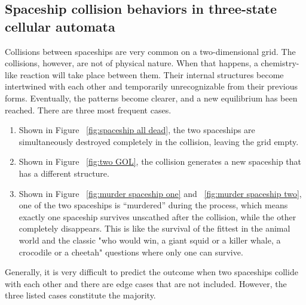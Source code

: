 \documentclass[12pt]{article}
\numberwithin{figure}{section} %
\begin{document}
\subsection{Spaceship collision behaviors in three-state cellular automata}
Collisions between spaceships are very common on a two-dimensional grid. The collisions, however, are not of physical nature. When that happens, a chemistry-like reaction will take place between them. Their internal structures become intertwined with each other and temporarily unrecognizable from their previous forms. Eventually, the patterns become clearer, and a new equilibrium has been reached. There are three most frequent cases. 
\begin{enumerate}[topsep=0pt,itemsep=-1ex,partopsep=1ex,parsep=1ex]
\item Shown in Figure ~\ref{fig:spaceship all dead}, the two spaceships are simultaneously destroyed completely in the collision, leaving the grid empty. 
\item Shown in Figure ~\ref{fig:two GOL}, the collision generates a new spaceship that has a different structure. 
\item Shown in Figure ~\ref{fig:murder spaceship one} and ~\ref{fig:murder spaceship two}, one of the two spaceships is “murdered” during the process, which means exactly one spaceship survives unscathed after the collision, while the other completely disappears. This is like the survival of the fittest in the animal world and the classic "who would win, a giant squid or a killer whale, a crocodile or a cheetah" questions where only one can survive. 
\end{enumerate}
Generally, it is very difficult to predict the outcome when two spaceships collide with each other and there are edge cases that are not included. However, the three listed cases constitute the majority. 
\end{document}
